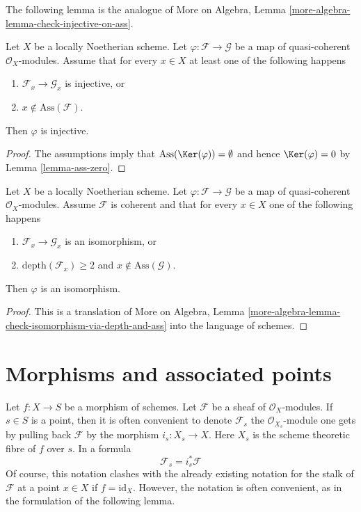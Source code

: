 \noindent
The following lemma is the analogue of
More on Algebra, Lemma \ref{more-algebra-lemma-check-injective-on-ass}.

\begin{lemma}
\label{lemma-check-injective-on-ass}
Let $X$ be a locally Noetherian scheme. Let
$\varphi : \mathcal{F} \to \mathcal{G}$ be a map of
quasi-coherent $\mathcal{O}_X$-modules.
Assume that for every $x \in X$
at least one of the following happens
\begin{enumerate}
\item $\mathcal{F}_x \to \mathcal{G}_x$ is injective, or
\item $x \not \in \text{Ass}(\mathcal{F})$.
\end{enumerate}
Then $\varphi$ is injective.
\end{lemma}

\begin{proof}
The assumptions imply that $\text{Ass}(\Ker(\varphi)) = \emptyset$
and hence $\Ker(\varphi) = 0$ by Lemma \ref{lemma-ass-zero}.
\end{proof}

\begin{lemma}
\label{lemma-check-isomorphism-via-depth-and-ass}
Let $X$ be a locally Noetherian scheme. Let
$\varphi : \mathcal{F} \to \mathcal{G}$ be a map of
quasi-coherent $\mathcal{O}_X$-modules. Assume $\mathcal{F}$ is coherent
and that for every $x \in X$ one of the following happens
\begin{enumerate}
\item $\mathcal{F}_x \to \mathcal{G}_x$ is an isomorphism, or
\item $\text{depth}(\mathcal{F}_x) \geq 2$ and
$x \not \in \text{Ass}(\mathcal{G})$.
\end{enumerate}
Then $\varphi$ is an isomorphism.
\end{lemma}

\begin{proof}
This is a translation of More on Algebra, Lemma
\ref{more-algebra-lemma-check-isomorphism-via-depth-and-ass}
into the language of schemes.
\end{proof}




\section{Morphisms and associated points}
\label{section-morphisms-associated}

\noindent
Let $f : X \to S$ be a morphism of schemes.
Let $\mathcal{F}$ be a sheaf of $\mathcal{O}_X$-modules.
If $s \in S$ is a point, then it is often convenient to
denote $\mathcal{F}_s$ the $\mathcal{O}_{X_s}$-module
one gets by pulling back $\mathcal{F}$ by the morphism
$i_s : X_s \to X$. Here $X_s$ is the scheme theoretic fibre of $f$ over $s$.
In a formula
$$
\mathcal{F}_s = i_s^*\mathcal{F}
$$
Of course, this notation clashes with the already existing notation
for the stalk of $\mathcal{F}$ at a point $x \in X$ if $f = \text{id}_X$.
However, the notation is often convenient, as in the formulation of
the following lemma.

